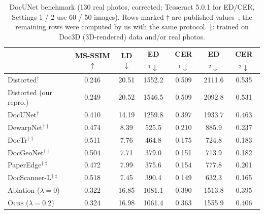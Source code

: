 \documentclass[a4paper,fleqn]{cas-sc}
\newcommand{\ours}{\textsc{Ours}}
\begin{document}
\begin{table}[t]
\centering
\caption{DocUNet benchmark (130 real photos, corrected; Tesseract 5.0.1 for ED/CER, Settings 1 / 2 use 60 / 50 images). Rows marked $\dagger$ are published values~\cite{feng2022docgeonet,feng2025docscanner}; the remaining rows were computed by us with the same protocol. $\ddagger$: trained on Doc3D (3D-rendered) data and/or real photos.}
\label{tab:docunet}
\footnotesize\setlength{\tabcolsep}{1.8pt}
\begin{tabular}{@{}lcccccc@{}}
\toprule
 & MS-SSIM$\uparrow$ & LD$\downarrow$ & ED$_1\downarrow$ & CER$_1\downarrow$ & ED$_2\downarrow$ & CER$_2\downarrow$ \\
\midrule
Distorted$^\dagger$ & 0.246 & 20.51 & 1552.2 & 0.509 & 2111.6 & 0.535 \\
Distorted (our repro.) & 0.249 & 20.52 & 1546.5 & 0.509 & 2092.8 & 0.531 \\
\midrule
DocUNet$^\dagger$~\cite{ma2018docunet} & 0.410 & 14.19 & 1259.8 & 0.397 & 1933.7 & 0.463 \\
DewarpNet$^{\dagger\ddagger}$~\cite{das2019dewarpnet} & 0.474 & 8.39 & 525.5 & 0.210 & 885.9 & 0.237 \\
DocTr$^{\dagger\ddagger}$~\cite{feng2021doctr} & 0.511 & 7.76 & 464.8 & 0.175 & 724.8 & 0.183 \\
DocGeoNet$^{\dagger\ddagger}$~\cite{feng2022docgeonet} & 0.504 & 7.71 & 379.0 & 0.151 & 713.9 & 0.182 \\
PaperEdge$^{\dagger\ddagger}$~\cite{ma2022paperedge} & 0.472 & 7.99 & 375.6 & 0.154 & 777.8 & 0.201 \\
DocScanner-L$^{\dagger\ddagger}$~\cite{feng2025docscanner} & 0.518 & 7.45 & 390.4 & 0.149 & 632.3 & 0.165 \\
\midrule
Ablation ($\lambda=0$) & 0.322 & 16.85 & 1081.1 & 0.390 & 1513.8 & 0.395 \\
\ours{} ($\lambda=0.2$) & 0.324 & 16.98 & 1061.4 & 0.363 & 1555.9 & 0.406 \\
\bottomrule
\end{tabular}
\end{table}
\end{document}
